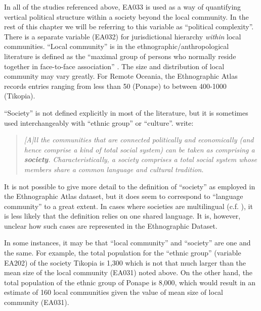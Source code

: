 \documentclass[a4paper,10pt]{article} %
\begin{document}
In all of the studies referenced above, EA033 is used as a way of quantifying vertical political structure within a society beyond the local community. In the rest of this chapter we will be referring to this variable as ``political complexity''. There is a separate variable (EA032) for jurisdictional hierarchy \emph{within} local communities. ``Local community'' is in the ethnographic/anthropological literature is defined as the ``maximal group of persons who normally reside together in face-to-face association'' \citep{yale1945outline}. The size and distribution of local community may vary greatly. For Remote Oceania, the Ethnographic Atlas records entries ranging from less than 50 (Ponape) to between 400-1000 (Tikopia).

``Society'' is not defined explicitly in most of the literature, but it is sometimes used interchangeably with ``ethnic group'' or ``culture''. \citet{roger1981cultural} write:

\begin{quotation}
\noindent\emph{[A]ll the communities that are connected politically and economically (and hence comprise a kind of total social system) can be taken as comprising a \textbf{society}. Characteristically, a society comprises a total social system whose members share a common language and cultural tradition}. 
\begin{flushright}
\citep[22]{roger1981cultural} 
\end{flushright}
 \end{quotation}


It is not possible to give more detail to the definition of ``society'' as employed in the Ethnographic Atlas dataset, but it does seem to correspond to ``language community'' to a great extent. In cases where societies are multilingual (c.f. \citet{evans2017did}), it is less likely that the definition relies on one shared language. It is, however, unclear how such cases are represented in the Ethnographic Dataset.

In some instances, it may be that ``local community'' and ``society'' are one and the same. For example, the total population for the ``ethnic group'' (variable EA202) of the society Tikopia is 1,300 which is not that much larger than the mean size of the local community (EA031) noted above. On the other hand, the total population of the ethnic group of Ponape is 8,000, which would result in an estimate of 160 local communities given the value of mean size of local community (EA031).
  
\end{document}
